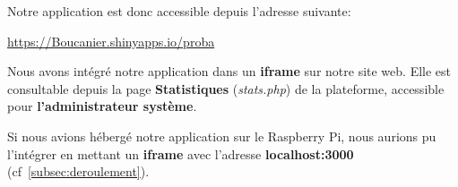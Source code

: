 \documentclass[12pt, a4paper]{article}
\begin{document}
\noindent Notre application est donc accessible depuis l'adresse suivante:
\begin{center}
    \url{https://Boucanier.shinyapps.io/proba}
\end{center}

\noindent Nous avons intégré notre application dans un \textbf{iframe} sur notre site web.
Elle est consultable depuis la page \textbf{Statistiques} (\textit{stats.php}) de la plateforme,
accessible pour \textbf{l'administrateur système}.

\bigskip
Si nous avions hébergé notre application sur le Raspberry Pi,
nous aurions pu l'intégrer en mettant un \textbf{iframe} avec l'adresse \textbf{localhost\string:3000} (cf~\ref{subsec:deroulement}).
\end{document}
